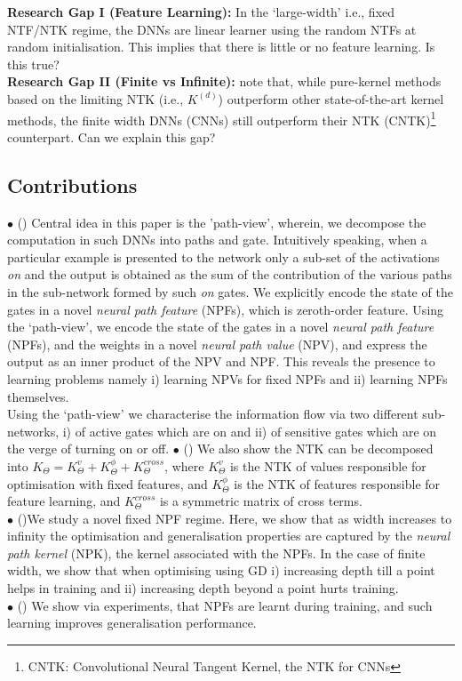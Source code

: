 \textbf{Research Gap I (Feature Learning):} In the `large-width' i.e., fixed NTF/NTK regime, the DNNs are linear learner using the random NTFs at random initialisation. This implies that there is little or no feature learning. Is this true?\\
\textbf{Research Gap II (Finite vs Infinite):} \cite{arora2019exact} note that, while pure-kernel methods based on the limiting NTK (i.e., $K^{(d)}$) outperform other state-of-the-art kernel methods, the finite width DNNs (CNNs) still outperform their NTK (CNTK)\footnote{CNTK: Convolutional Neural Tangent Kernel, the NTK for CNNs} counterpart. Can we explain this gap?
\subsection{Contributions}
$\bullet$ () Central idea in this paper is the 'path-view', wherein, we decompose the computation in such DNNs into paths and gate. Intuitively speaking, when a particular example is presented to the network only a sub-set of the activations \emph{on} and the output is obtained as the sum of the contribution of the various paths in the sub-network formed by such \emph{on} gates. We explicitly encode the state of the gates in a novel \emph{neural path feature} (NPFs), which is zeroth-order feature. 
Using the `path-view', we  encode the state of the gates in a novel \emph{neural path feature} (NPFs), and the weights in a novel \emph{neural path value} (NPV), and express the output as an inner product of the NPV and NPF. This reveals the presence to learning problems namely i) learning NPVs for fixed NPFs and ii) learning NPFs themselves.\\
Using the `path-view' we characterise the information flow via two different sub-networks, i) of active gates which are on and ii) of sensitive gates which are on the verge of turning on or off. 
$\bullet$ () We also show the NTK can be decomposed into $K_{\Theta}=K^v_{\Theta}+K^{\phi}_{\Theta}+K^{cross}_{\Theta}$, where $K^v_{\Theta}$ is the NTK of values responsible for optimisation with fixed features, and $K^{\phi}_{\Theta}$ is the NTK of features responsible for feature learning, and $K^{cross}_{\Theta}$ is a symmetric matrix of cross terms. \\
$\bullet$ ()We study a novel fixed NPF regime. Here, we show that as width increases to infinity the optimisation and generalisation properties are captured by the \emph{neural path kernel} (NPK), the kernel associated with the NPFs. In the case of finite width,  we show that when optimising  using GD i) increasing depth till a point helps in training and ii) increasing depth beyond a point hurts training.\\
$\bullet$ () We show via experiments, that NPFs are learnt during training, and such learning improves generalisation performance.